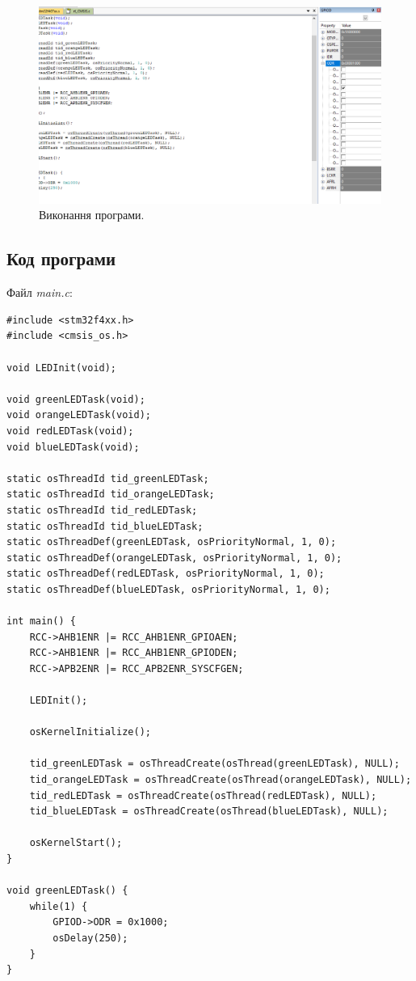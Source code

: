 \documentclass[oneside,14pt]{extarticle}
\begin{document}
\begin{normalsize}
	\begin{figure}[H]
		\centering
		\includegraphics[scale=0.45]{3}
		\caption{Виконання програми.}
	\end{figure}
	
	\subsection*{Код програми}
	Файл \textit{main.c}:
	{\small
		\begin{lstlisting}
#include <stm32f4xx.h>
#include <cmsis_os.h>

void LEDInit(void);

void greenLEDTask(void);
void orangeLEDTask(void);
void redLEDTask(void);
void blueLEDTask(void);

static osThreadId tid_greenLEDTask;
static osThreadId tid_orangeLEDTask;
static osThreadId tid_redLEDTask;
static osThreadId tid_blueLEDTask;
static osThreadDef(greenLEDTask, osPriorityNormal, 1, 0);
static osThreadDef(orangeLEDTask, osPriorityNormal, 1, 0);
static osThreadDef(redLEDTask, osPriorityNormal, 1, 0);
static osThreadDef(blueLEDTask, osPriorityNormal, 1, 0);

int main() {
	RCC->AHB1ENR |= RCC_AHB1ENR_GPIOAEN;
	RCC->AHB1ENR |= RCC_AHB1ENR_GPIODEN;
	RCC->APB2ENR |= RCC_APB2ENR_SYSCFGEN;
	
	LEDInit();
	
	osKernelInitialize();
	
	tid_greenLEDTask = osThreadCreate(osThread(greenLEDTask), NULL);
	tid_orangeLEDTask = osThreadCreate(osThread(orangeLEDTask), NULL);
	tid_redLEDTask = osThreadCreate(osThread(redLEDTask), NULL);
	tid_blueLEDTask = osThreadCreate(osThread(blueLEDTask), NULL);
	
	osKernelStart();
}

void greenLEDTask() {
	while(1) {
		GPIOD->ODR = 0x1000;
		osDelay(250);
	}
}


\end{lstlisting}}
\end{normalsize}
\end{document}
